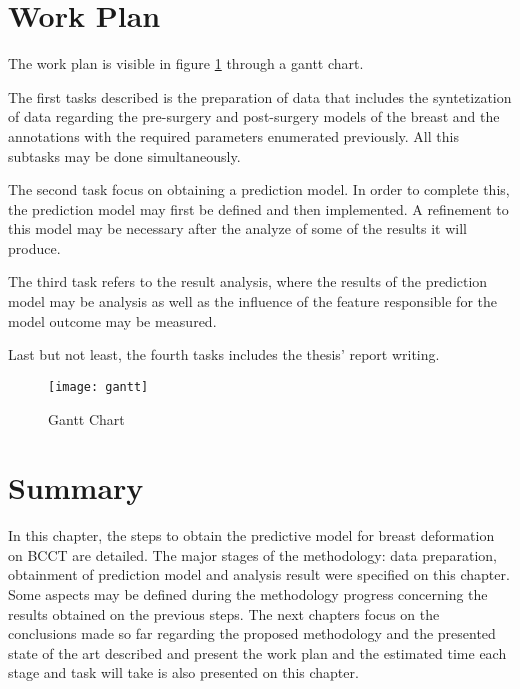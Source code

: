 \section{Work Plan}

The work plan is visible in figure \ref{fig:gantt} through a gantt chart.

The first tasks described is the preparation of data that includes the syntetization of data regarding the pre-surgery and post-surgery models of the breast and the annotations with the required parameters enumerated previously. All this subtasks may be done simultaneously.

The second task focus on obtaining a prediction model. In order to complete this, the prediction model may first be defined and then implemented. A refinement to this model may be necessary after the analyze of some of the results it will produce.

The third task refers to the result analysis, where the results of the prediction model may be analysis as well as the influence of the feature responsible for the model outcome may be measured.

Last but not least, the fourth tasks includes the thesis' report writing.

\begin{figure}[H]
  \begin{center}
    \leavevmode
    \texttt{[image: gantt]}
    \caption{Gantt Chart}
    \label{fig:gantt}
  \end{center}
\end{figure}


\section{Summary}

In this chapter, the steps to obtain the predictive model for breast deformation on BCCT are detailed. The major stages of the methodology: data preparation, obtainment of prediction model and analysis result were specified on this chapter. Some aspects may be defined during the methodology progress concerning the results obtained on the previous steps. The next chapters focus on the conclusions made so far regarding the proposed methodology and the presented state of the art described and present the work plan and the estimated time each stage and task will take is also presented on this chapter.

